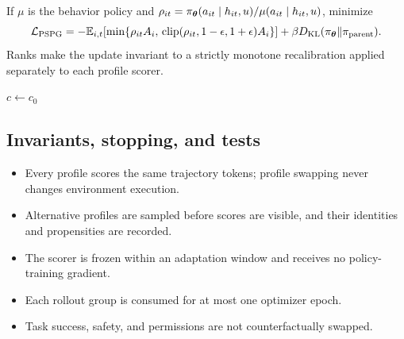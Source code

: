 If $\mu$ is the behavior policy and
$\rho_{it}=\pi_{\bm{\theta}}(a_{it}\mid h_{it},u)/\mu(a_{it}\mid h_{it},u)$, minimize
\begin{equation}
  \mathcal{L}_{\mathrm{PSPG}}
  =
  -\mathbb{E}_{i,t}\!\left[
    \min\!\left\{
      \rho_{it}A_i,\,
      \operatorname{clip}(\rho_{it},1-\epsilon,1+\epsilon)A_i
    \right\}
  \right]
  +
  \beta D_{\mathrm{KL}}(\pi_{\bm{\theta}}\Vert\pi_{\mathrm{parent}}).
  \label{eq:profile-policy-loss}
\end{equation}
Ranks make the update invariant to a strictly monotone recalibration applied
separately to each profile scorer.

\begin{algorithm}[t]
  \caption{Profile-Swap Policy Gradient}
  \label{alg:profile-swap}
  $c\leftarrow c_0$\;
\end{algorithm}

\subsection{Invariants, stopping, and tests}

\begin{itemize}
  \item Every profile scores the same trajectory tokens; profile swapping
  never changes environment execution.
  \item Alternative profiles are sampled before scores are visible, and their
  identities and propensities are recorded.
  \item The scorer is frozen within an adaptation window and receives no
  policy-training gradient.
  \item Each rollout group is consumed for at most one optimizer epoch.
  \item Task success, safety, and permissions are not counterfactually
  swapped.
\end{itemize}

